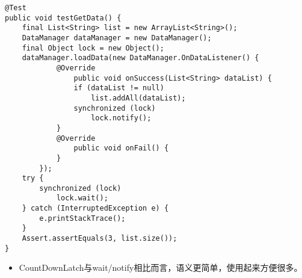 \documentclass[9pt, b5paper]{article}
\begin{document}
\begin{verbatim}
@Test
public void testGetData() {
    final List<String> list = new ArrayList<String>();
    DataManager dataManager = new DataManager();
    final Object lock = new Object();
    dataManager.loadData(new DataManager.OnDataListener() {
            @Override
                public void onSuccess(List<String> dataList) {
                if (dataList != null) 
                    list.addAll(dataList);
                synchronized (lock) 
                    lock.notify();
            }
            @Override
                public void onFail() {
            }
        });
    try {
        synchronized (lock) 
            lock.wait();
    } catch (InterruptedException e) {
        e.printStackTrace();
    }
    Assert.assertEquals(3, list.size());
}
\end{verbatim}
\begin{itemize}
\item CountDownLatch与wait/notify相比而言，语义更简单，使用起来方便很多。
\end{itemize}
\end{document}
